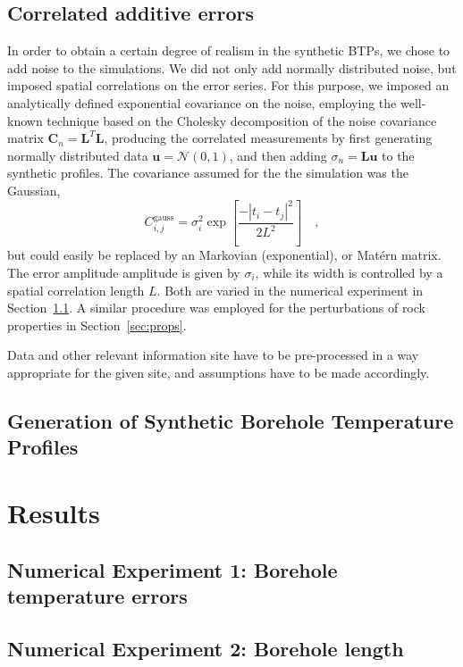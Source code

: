 \documentclass[cp]{copernicus}
\begin{document}
\subsection{Correlated additive errors}
In order to obtain a certain degree of realism in the synthetic BTPs, we chose to add noise to the 
simulations. We did not only add normally distributed noise, but imposed spatial correlations on 
the error series. For this purpose, we imposed an analytically defined exponential covariance on the 
noise, employing the well-known technique based on the Cholesky decomposition of the noise 
covariance matrix $\mathbf{C}_{n}=\mathbf{L}^T\mathbf{L}$, producing the correlated measurements 
by first generating normally distributed data $\mathbf{u}=\mathcal{N}(0,1)$, and then adding 
$\sigma_n = \mathbf{L}\mathbf{u}$ to the synthetic profiles. The covariance assumed for the  the 
simulation was the Gaussian, 
\begin{equation}\label{eqn:covg}
C_{i,j}^{{\text{gauss}}} = \sigma _i^2\exp \left[ {\frac{{ - {{\left| {{t_i} - 
{t_j}} \right|}^2}}}{{2{L^2}}}} \right] \quad , 
\end{equation}  
\noindent but could easily be replaced by an Markovian (exponential), or Mat\'ern matrix. The error 
amplitude amplitude is given by $\sigma_i$, while its width is controlled by a spatial
correlation length $L$. Both are varied in the numerical experiment in Section~\ref{sec:errors}. A 
similar procedure was employed for the perturbations of rock properties in Section~\ref{sec:props}.



Data and other relevant information site have to be pre-processed in a way appropriate for the 
given 
site, and assumptions have to be made accordingly. 

\subsection{Generation of Synthetic Borehole Temperature Profiles}

\section{Results}
\subsection{Numerical Experiment 1: Borehole temperature errors}\label{sec:errors}
\subsection{Numerical Experiment 2: Borehole length}\label{sec:length}
\end{document}
